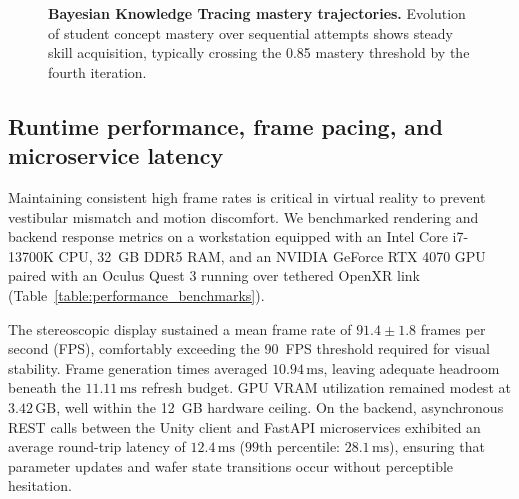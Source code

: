 \documentclass[10pt,a4paper,twocolumn]{article}
\begin{document}
\begin{figure}[!b]
\centering
{}
\caption{\textbf{Bayesian Knowledge Tracing mastery trajectories.} Evolution of student concept mastery over sequential attempts shows steady skill acquisition, typically crossing the 0.85 mastery threshold by the fourth iteration.}
\label{fig:bkt_curves}
\end{figure}

\subsection*{Runtime performance, frame pacing, and microservice latency}
Maintaining consistent high frame rates is critical in virtual reality to prevent vestibular mismatch and motion discomfort. We benchmarked rendering and backend response metrics on a workstation equipped with an Intel Core i7-13700K CPU, 32~GB DDR5 RAM, and an NVIDIA GeForce RTX 4070 GPU paired with an Oculus Quest 3 running over tethered OpenXR link (Table~\ref{table:performance_benchmarks}).

The stereoscopic display sustained a mean frame rate of $91.4 \pm 1.8$ frames per second (FPS), comfortably exceeding the 90~FPS threshold required for visual stability. Frame generation times averaged $10.94\,\text{ms}$, leaving adequate headroom beneath the $11.11\,\text{ms}$ refresh budget. GPU VRAM utilization remained modest at $3.42\,\text{GB}$, well within the 12~GB hardware ceiling. On the backend, asynchronous REST calls between the Unity client and FastAPI microservices exhibited an average round-trip latency of $12.4\,\text{ms}$ ($99\text{th}$ percentile: $28.1\,\text{ms}$), ensuring that parameter updates and wafer state transitions occur without perceptible hesitation.
\end{document}
